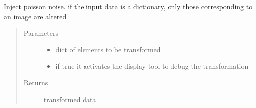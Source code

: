\documentclass[letterpaper,10pt,english]{sphinxmanual}
\begin{document}
\begin{fulllineitems}
\label{\detokenize{ida_lib.operations:ida_lib.operations.transforms.inject_poisson_noise}}
Inject poisson noise. if the input data is a dictionary, only those corresponding to an image are altered
\begin{quote}\begin{description}
\item[{Parameters}] \leavevmode\begin{itemize}
\item {} 
 \textendash{} dict of elements to be transformed

\item {} 
 \textendash{} if true it activates the display tool to debug the transformation

\end{itemize}

\item[{Returns}] \leavevmode
transformed data

\end{description}\end{quote}

\end{fulllineitems}

\end{document}
